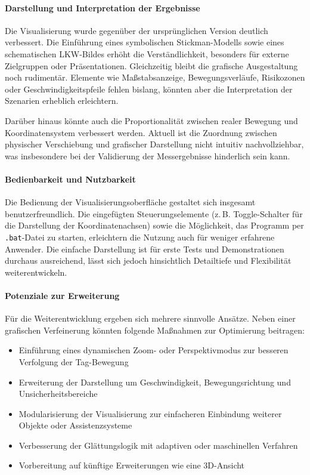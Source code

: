 \documentclass[a4paper, 12pt]{article} %
\begin{document}
\paragraph{Darstellung und Interpretation der Ergebnisse}

Die Visualisierung wurde gegenüber der ursprünglichen Version deutlich verbessert. Die Einführung eines symbolischen Stickman-Modells sowie 
eines schematischen \ac{LKW}-Bildes erhöht die Verständlichkeit, besonders für externe Zielgruppen oder Präsentationen. Gleichzeitig bleibt die 
grafische Ausgestaltung noch rudimentär. Elemente wie Maßstabsanzeige, Bewegungsverläufe, Risikozonen oder Geschwindigkeitspfeile fehlen bislang, 
könnten aber die Interpretation der Szenarien erheblich erleichtern.

Darüber hinaus könnte auch die Proportionalität zwischen realer Bewegung und Koordinatensystem verbessert werden. Aktuell ist die Zuordnung zwischen 
physischer Verschiebung und grafischer Darstellung nicht intuitiv nachvollziehbar, was insbesondere bei der Validierung der Messergebnisse hinderlich 
sein kann.

\paragraph{Bedienbarkeit und Nutzbarkeit}

Die Bedienung der Visualisierungsoberfläche gestaltet sich insgesamt benutzerfreundlich. Die eingefügten Steuerungselemente (z.\,B. Toggle-Schalter 
für die Darstellung der Koordinatenachsen) sowie die Möglichkeit, das Programm per \texttt{.bat}-Datei zu starten, erleichtern die Nutzung auch für 
weniger erfahrene Anwender. Die einfache Darstellung ist für erste Tests und Demonstrationen durchaus ausreichend, lässt sich jedoch hinsichtlich 
Detailtiefe und Flexibilität weiterentwickeln.

\paragraph{Potenziale zur Erweiterung}

Für die Weiterentwicklung ergeben sich mehrere sinnvolle Ansätze. Neben einer grafischen Verfeinerung könnten folgende Maßnahmen zur 
Optimierung beitragen:

\begin{itemize}
    \item Einführung eines dynamischen Zoom- oder Perspektivmodus zur besseren Verfolgung der Tag-Bewegung
    \item Erweiterung der Darstellung um Geschwindigkeit, Bewegungsrichtung und Unsicherheitsbereiche
    \item Modularisierung der Visualisierung zur einfacheren Einbindung weiterer Objekte oder Assistenzsysteme
    \item Verbesserung der Glättungslogik mit adaptiven oder maschinellen Verfahren
    \item Vorbereitung auf künftige Erweiterungen wie eine 3D-Ansicht
\end{itemize}
\end{document}
